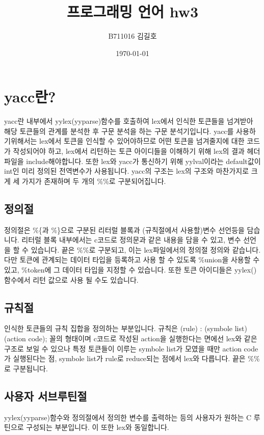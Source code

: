 \documentclass{article}
\title{프로그래밍 언어 hw3}
\author{B711016 김길호}
\date{\today}
\begin{document}
\maketitle
\newpage

\section{yacc란?}
    yacc란 내부에서 yylex(yyparse)함수를 호출하여 lex에서 인식한 토큰들을 넘겨받아 해당 토큰들의 관계를 분석한 후 구문 분석을 하는 구문 분석기입니다. 
    yacc를 사용하기위해서는 lex에서 토큰을 인식할 수 있어야하므로 어떤 토큰을 넘겨줄지에 대한 코드가 작성되어야 하고, lex에서 리턴하는 토큰 아이디들을
    이해하기 위해 lex의 결과 헤더파일을 include해야합니다. 또한 lex와 yacc가 통신하기 위해 yylval이라는 default값이 int인 미리 정의된 전역변수가 사용됩니다.
    yacc의 구조는 lex의 구조와 마찬가지로 크게 세 가지가 존재하며 두 개의 \%\%로 구분되어집니다. 
    \subsection{정의절}
        정의절은 \%\{과 \%\}으로 구분된 리터럴 블록과 (규칙절에서 사용할)변수 선언등을 담습니다. 리터럴 블록 내부에서는 
        c코드로 정의문과 같은 내용을 담을 수 있고, 변수 선언을 할 수 있습니다. 끝은 \%\%로 구분되고, 이는 lex파일에서의 정의절
        정의와 같습니다. 다만 토큰에 관계되는 데이터 타입을 등록하고 사용 할 수 있도록 \%union을 사용할 수 있고, \%token에 그 데이터 타입을 
        지정할 수 있습니다. 또한 토큰 아이디들은 yylex() 함수에서 리턴 값으로 사용 될 수도 있습니다.
    \subsection{규칙절}
        인식한 토큰들의 규칙 집합을 정의하는 부분입니다. 규칙은 (rule) : (symbole list) (action code); 꼴의 형태이며 c코드로 작성된 action을 실행한다는 면에선
        lex와 같은 구조로 보일 수 있으나 특정 토큰들이 이루는 symbole list가 모였을 때만 action code가 실행된다는 점, symbole list가 rule로 reduce되는
        점에서 lex와 다릅니다. 
        끝은 \%\%로 구분됩니다.
    \subsection{사용자 서브루틴절}
        yylex(yyparse)함수와 정의절에서 정의한 변수를 출력하는 등의 사용자가 원하는 C 루틴으로 구성되는 부분입니다. 이 또한 lex와 동일합니다.\\
\end{document}
